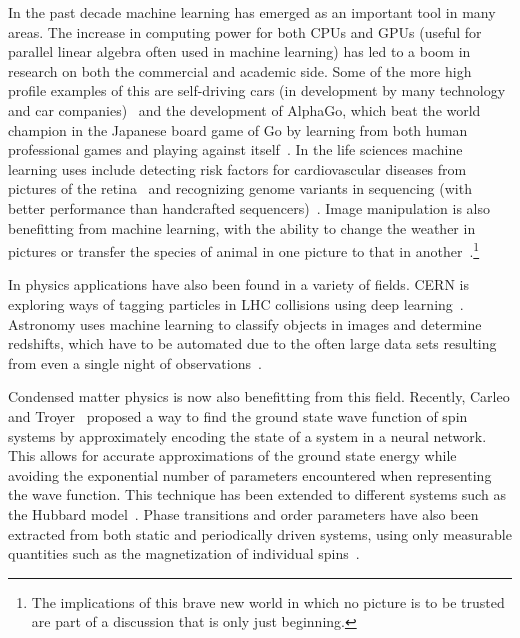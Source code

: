 \documentclass[11pt, a4paper]{report} %
\begin{document}
In the past decade machine learning has emerged as an important tool in many areas.
The increase in computing power for both CPUs and GPUs (useful for parallel linear algebra often used in machine learning) has led to a boom in research on both the commercial and academic side.
Some of the more high profile examples of this are self-driving cars (in development by many technology and car companies)~\cite{levinson11_towar} and the development of AlphaGo, which beat the world champion in the Japanese board game of Go by learning from both human professional games and playing against itself~\cite{Silver2017a,Silver2017,silver16_master_game_go_with_deep}.
In the life sciences machine learning uses include detecting risk factors for cardiovascular diseases from pictures of the retina~\cite{poplin17_predic_cardiov_risk_factor_from} and recognizing genome variants in sequencing (with better performance than handcrafted sequencers)~\cite{Poplin2016}.
Image manipulation is also benefitting from machine learning, with the ability to change the weather in pictures or transfer the species of animal in one picture to that in another~\cite{Liu2017}.\footnote{The implications of this brave new world in which no picture is to be trusted are part of a discussion that is only just beginning.}

In physics applications have also been found in a variety of fields.
CERN is exploring ways of tagging particles in LHC collisions using deep learning~\cite{paganini17_machin_learn_algor_jet_taggin}.
Astronomy uses machine learning to classify objects in images and determine redshifts, which have to be automated due to the often large data sets resulting from even a single night of observations~\cite{ball10_data_minin_and_machin_learn_in_astron}.

Condensed matter physics is now also benefitting from this field.
Recently, Carleo and Troyer~\cite{Carleo2017} proposed a way to find the ground state wave function of spin systems by approximately encoding the state of a system in a neural network. This allows for accurate approximations of the ground state energy while avoiding the exponential number of parameters encountered when representing the wave function.
This technique has been extended to different systems such as the Hubbard model~\cite{Saito2017}.
Phase transitions and order parameters have also been extracted from both static and periodically driven systems, using only measurable quantities such as the magnetization of individual spins~\cite{Nieuwenburg2017}.
\end{document}
